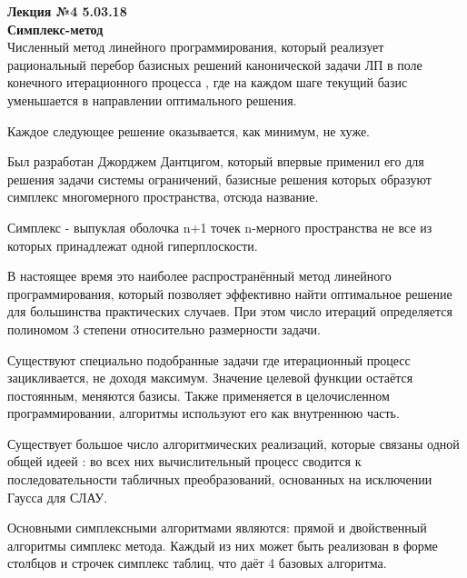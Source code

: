 \LARGE{ \textbf {Лекция №4 5.03.18}}\\
\Large{ \textbf {Симплекс-метод}}\\

​
Численный метод линейного программирования, который реализует рациональный перебор базисных решений канонической задачи ЛП в поле конечного итерационного процесса , где на каждом шаге текущий базис уменьшается в направлении оптимального решения.

Каждое следующее решение оказывается, как минимум, не хуже.

Был разработан Джорджем Дантцигом, который впервые применил его для решения задачи системы ограничений, базисные решения которых образуют симплекс многомерного пространства, отсюда название.

Симплекс - выпуклая оболочка n+1 точек n-мерного пространства не все из которых принадлежат одной гиперплоскости.

В настоящее время это наиболее распространённый метод линейного программирования, который позволяет эффективно найти оптимальное решение для большинства практических случаев. При этом число итераций определяется полиномом 3 степени относительно размерности задачи.

Существуют специально подобранные задачи где итерационный процесс зацикливается, не доходя максимум. Значение целевой функции остаётся постоянным, меняются базисы.
Также применяется в целочисленном программировании, алгоритмы используют его как внутреннюю часть.

Существует большое число алгоритмических реализаций, которые связаны одной общей идеей : во всех них вычислительный процесс сводится к последовательности табличных преобразований, основанных на исключении Гаусса для СЛАУ.

Основными симплексными алгоритмами являются: прямой и двойственный алгоритмы симплекс метода. Каждый из них может быть реализован в форме столбцов и строчек симплекс таблиц, что даёт 4 базовых алгоритма.

